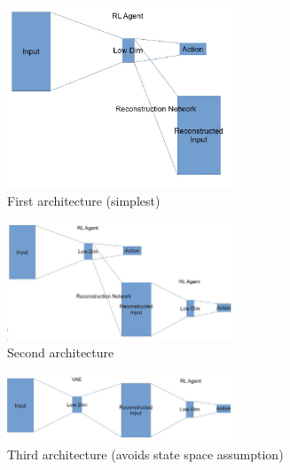 \documentclass[a4paper]{scrartcl}
\begin{document}
\begin{figure}[H]
    \centering
    \includegraphics[width=0.6\textwidth]{Arch1.JPG}
    \caption{First architecture (simplest)}
    \label{fig:arch1}
\end{figure}
\begin{figure}[H]
    \centering
    \includegraphics[width=0.6\textwidth]{Arch2.JPG}
    \caption{Second architecture}
    \label{fig:arch2}
\end{figure}
\begin{figure}[H]
    \centering
    \includegraphics[width=0.6\textwidth]{Arch3.JPG}
    \caption{Third architecture (avoids state space assumption)}
    \label{fig:arch3}
\end{figure}
\end{document}
